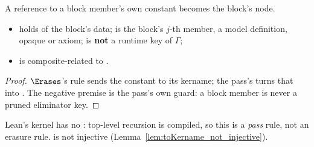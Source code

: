 \begin{lemma}
\label{lem:ErasesLB-fix}
\leanok
{}
 A reference to a block member's own constant becomes the block's \hl{} node.
\begin{itemize}
\item {}  holds of the block's data;  is the block's $j$-th member, a
model definition, opaque or axiom;  is \textbf{not} a runtime key of $\Gamma$;
\item {}  is composite-related to .
\end{itemize}
\end{lemma}
\begin{proof}
\leanok
{}
 $\Erases$'s  rule sends the constant to its kername; the pass's
 turns that into . The negative premise is the pass's own guard: a
block member is never a pruned eliminator key.
\end{proof}

\begin{remark}
 Lean's kernel has no : top-level recursion is compiled, so this is a \emph{pass}
rule, not an erasure rule.  is not injective (Lemma~\ref{lem:toKername_not_injective}).
\end{remark}

